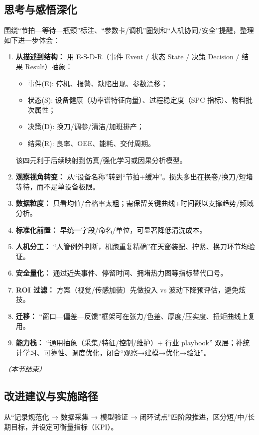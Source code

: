 \subsection{思考与感悟深化}
\begingroup\sloppy
围绕“节拍—等待—瓶颈”标注、“参数卡/调机”圈划和“人机协同/安全”提醒，整理如下进一步体会：
\begin{enumerate}[label=\arabic*.]
  \item \textbf{从描述到结构：} 用 E-S-D-R（事件 Event / 状态 State / 决策 Decision / 结果 Result）抽象：
  \begin{itemize}
    \item 事件(E): 停机、报警、缺陷出现、参数漂移；
    \item 状态(S): 设备健康（功率谱特征向量）、过程稳定度（SPC 指标）、物料批次属性；
    \item 决策(D): 换刀/调参/清洁/加班排产；
    \item 结果(R): 良率、OEE、能耗、交付周期。
  \end{itemize}
  该四元利于后续映射到仿真/强化学习或因果分析模型。
  \item \textbf{观察视角转变：} 从“设备名称”转到“节拍+缓冲”。损失多出在换卷/换刀/短堵等待，而不是单设备极限。
  \item \textbf{数据粒度：} 只看均值/合格率太粗；需保留关键曲线+时间戳以支撑趋势/频域分析。
  \item \textbf{标准化前置：} 早统一字段/命名/单位，可显著降低清洗成本。
  \item \textbf{人机分工：} “人管例外判断，机跑重复精确”在天窗装配、拧紧、换刀环节均验证。
  \item \textbf{安全量化：} 通过近失事件、停留时间、拥堵热力图等指标替代口号。
  \item \textbf{ROI 过滤：} 方案（视觉/传感加装）先做投入 vs 波动下降预评估，避免炫技。
  \item \textbf{迁移：} “窗口—偏差—反馈”框架可在张力/色差、厚度/压实度、扭矩曲线上复用。
  \item \textbf{能力栈：} “通用抽象（采集/特征/控制/维护）+ 行业 playbook” 双层；补统计学习、可靠性、调度优化，闭合“观察→建模→优化→验证”。
\end{enumerate}
\par\noindent\textit{（本节结束）}
\endgroup

\subsection{改进建议与实施路径}
从“记录规范化 → 数据采集 → 模型验证 → 闭环试点”四阶段推进，区分短/中/长期目标，并设定可衡量指标（KPI）。

